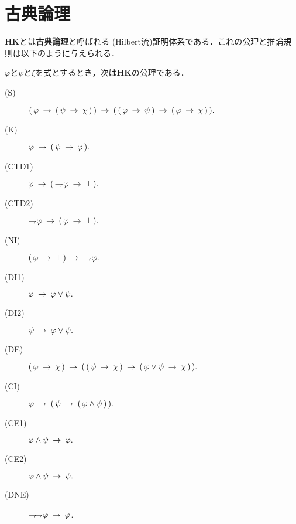 \section{古典論理}
	{\bf HK}とは{\bf 古典論理}と呼ばれる
	(Hilbert流)証明体系である．これの公理と推論規則は以下のように与えられる．
	
	\begin{screen}
		\begin{logicalaxm}
			$\varphi$と$\psi$と$\xi$を式とするとき，次は{\bf HK}の公理である．
			\begin{description}
				\item[(S)] $(\, \varphi \rarrow (\, \psi \rarrow \chi\, )\, ) 
					\rarrow (\, (\, \varphi \rarrow \psi\, )
					\rarrow (\, \varphi \rarrow \chi\, )\, ).$
				\item[(K)] $\varphi \rarrow (\, \psi \rarrow \varphi\, ).$
				\item[(CTD1)] $\varphi \rarrow (\, \negation \varphi \rarrow \bot\, ).$
				\item[(CTD2)] $\negation \varphi \rarrow (\, \varphi \rarrow \bot\, ).$
				\item[(NI)] $(\, \varphi \rarrow \bot\, ) \rarrow\ \negation \varphi.$
				\item[(DI1)] $\varphi \rarrow \varphi \vee \psi.$
				\item[(DI2)] $\psi \rarrow \varphi \vee \psi.$
				\item[(DE)] $(\, \varphi \rarrow \chi\, ) \rarrow 
					(\, (\, \psi \rarrow \chi\, ) 
					\rarrow (\, \varphi \vee \psi \rarrow \chi\, )\, ).$
				\item[(CI)] $\varphi \rarrow (\, \psi \rarrow (\, \varphi \wedge \psi\, )\, ).$
				\item[(CE1)] $\varphi \wedge \psi \rarrow \varphi.$
				\item[(CE2)] $\varphi \wedge \psi \rarrow \psi.$
				\item[(DNE)] $\negation \negation \varphi \rarrow \varphi$.
			\end{description}
		\end{logicalaxm}
	\end{screen}
	
